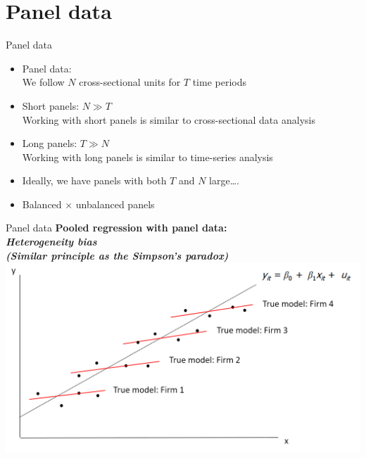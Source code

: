 \documentclass[usenames,dvipsnames]{beamer}
\begin{document}
\section{Panel data}
\begin{frame}{Panel data}
\begin{itemize}
\item Panel data:\\
We follow $N$ cross-sectional units for $T$ time periods
\vspace{0.5cm}
\item Short panels: $N \gg T$ \\
Working with short panels is similar to cross-sectional data analysis
\vspace{0.5cm}
\item Long panels: $T \gg N$ \\
Working with long panels is similar to time-series analysis
\vspace{0.5cm}
\item Ideally, we have panels with both $T$ and $N$ large….
\vspace{0.5cm}
\item Balanced $\times$ unbalanced panels
\end{itemize}
\end{frame}
\begin{frame}{Panel data}
\textbf{Pooled regression with panel data: \\
\textit{Heterogeneity bias\\
(Similar principle as the Simpson's paradox) }}
\includegraphics[width=\textwidth]{./img/Obrazek4}
\end{frame}
\end{document}

